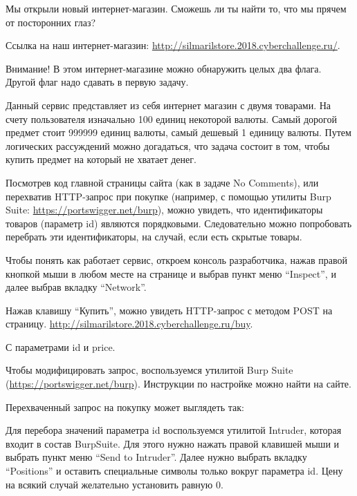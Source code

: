 
Мы открыли новый интернет-магазин. Сможешь ли ты найти то, что мы прячем от посторонних глаз?

Ссылка на наш интернет-магазин: \url{http://silmarilstore.2018.cyberchallenge.ru/}.

Внимание! В этом интернет-магазине можно обнаружить целых два флага. Другой флаг надо сдавать в первую задачу.

\solutionSection

Данный сервис представляет из себя интернет магазин с двумя товарами. На счету пользователя изначально 100 единиц некоторой валюты. Самый дорогой предмет стоит 999999 единиц валюты, самый дешевый 1 единицу валюты. Путем логических рассуждений можно догадаться, что задача состоит в том, чтобы купить предмет на который не хватает денег.

Посмотрев код главной страницы сайта (как в задаче No Comments), или перехватив HTTP-запрос при покупке (например, с помощью утилиты Burp Suite: \url{https://portswigger.net/burp}), можно увидеть, что идентификаторы товаров (параметр id) являются порядковыми. Следовательно можно попробовать перебрать эти идентификаторы, на случай, если есть скрытые товары.

Чтобы понять как работает сервис, откроем консоль разработчика, нажав правой кнопкой мыши в любом месте на странице и выбрав пункт меню “Inspect”, и далее выбрав вкладку “Network”.

Нажав клавишу “Купить”, можно увидеть HTTP-запрос с методом POST на страницу. \url{http://silmarilstore.2018.cyberchallenge.ru/buy}.


С параметрами id и price.


Чтобы модифицировать запрос, воспользуемся утилитой Burp Suite (\url{https://portswigger.net/burp}). Инструкции по настройке можно найти на сайте. 

Перехваченный запрос на покупку может выглядеть так:


Для перебора значений параметра id воспользуемся утилитой Intruder, которая входит в состав BurpSuite. Для этого нужно нажать правой клавишей мыши и выбрать пункт меню “Send to Intruder”. Далее нужно выбрать вкладку “Positions” и оставить специальные символы только вокруг параметра id. Цену на всякий случай желательно установить равную 0.

